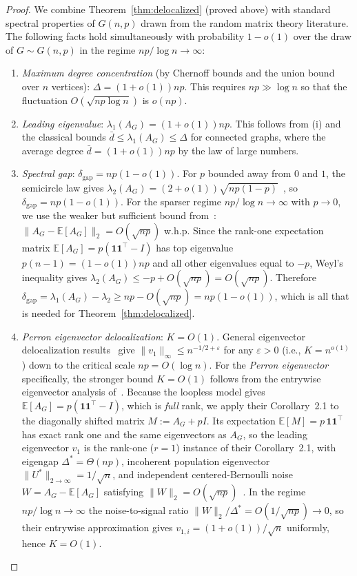 \documentclass[11pt]{article}
\theoremstyle{definition}
\newcommand{\eps}{\varepsilon}
\newcommand{\lamG}{\lambda_1(A_G)}
\newcommand{\vone}{v_1}
\newcommand{\E}{\mathbb{E}}
\begin{document}
\begin{proof}
We combine Theorem~\ref{thm:delocalized} (proved above) with standard spectral
properties of $G(n,p)$ drawn from the random matrix theory literature.
The following facts hold simultaneously with probability $1 - o(1)$ over the draw
of $G \sim G(n,p)$ in the regime $np/\log n \to \infty$:

\begin{enumerate}[label=(\roman*),nosep]
\item \emph{Maximum degree concentration} (by Chernoff bounds and the union bound over
$n$ vertices):
$\Delta = (1+o(1))np$. This requires $np \gg \log n$ so that the fluctuation
$O(\sqrt{np\log n})$ is $o(np)$.

\item \emph{Leading eigenvalue}: $\lamG = (1+o(1))np$.
This follows from (i) and the classical bounds $\bar{d} \leq \lamG \leq \Delta$
for connected graphs, where the average degree $\bar{d} = (1+o(1))np$ by the
law of large numbers.

\item \emph{Spectral gap}: $\delta_{\mathrm{gap}} = np(1 - o(1))$.
For $p$ bounded away from $0$ and $1$, the semicircle law gives
$\lambda_2(A_G) = (2+o(1))\sqrt{np(1-p)}$~\citep{erdos2013spectral},
so $\delta_{\mathrm{gap}} = np(1-o(1))$.
For the sparser regime $np/\log n \to \infty$ with $p \to 0$, we use the weaker
but sufficient bound from~\citet{le2017concentration}:
$\|A_G - \E[A_G]\|_2 = O(\sqrt{np})$ w.h.p. Since the rank-one expectation matrix
$\E[A_G] = p(\mathbf{1}\mathbf{1}^\top - I)$ has top eigenvalue
$p(n-1) = (1-o(1))np$ and all other eigenvalues equal to $-p$,
Weyl's inequality gives $\lambda_2(A_G) \leq -p + O(\sqrt{np}) = O(\sqrt{np})$.
Therefore $\delta_{\mathrm{gap}} = \lamG - \lambda_2 \geq np - O(\sqrt{np})
= np(1 - o(1))$, which is all that is needed for
Theorem~\ref{thm:delocalized}.


\item \emph{Perron eigenvector delocalization}: $K = O(1)$.
General eigenvector delocalization results~\citep{he2019eigenvectors} give
$\|\vone\|_\infty \leq n^{-1/2+\eps}$ for any $\eps > 0$ (i.e., $K = n^{o(1)}$)
down to the critical scale $np = O(\log n)$.
For the \emph{Perron eigenvector} specifically, the stronger bound $K = O(1)$
follows from the entrywise eigenvector analysis of~\citet[Corollary~2.1]{abbe2020entrywise}.
Because the loopless model gives $\E[A_G] = p(\mathbf{1}\mathbf{1}^\top - I)$,
which is \emph{full} rank, we apply their Corollary~2.1 to the diagonally shifted
matrix $M := A_G + pI$. Its expectation $\E[M] = p\,\mathbf{1}\mathbf{1}^\top$ has
exact rank one and the same eigenvectors as $A_G$, so the leading eigenvector $\vone$
is the rank-one ($r=1$) instance of their Corollary~2.1, with eigengap
$\Delta^* = \Theta(np)$, incoherent population eigenvector
$\|U^*\|_{2\to\infty} = 1/\sqrt{n}$, and independent centered-Bernoulli noise
$W = A_G - \E[A_G]$ satisfying $\|W\|_2 = O(\sqrt{np})$~\citep{le2017concentration}.
In the regime $np/\log n \to \infty$ the noise-to-signal ratio
$\|W\|_2/\Delta^* = O(1/\sqrt{np}) \to 0$, so their entrywise approximation gives
$v_{1,i} = (1+o(1))/\sqrt{n}$ uniformly, hence $K = O(1)$.


\end{enumerate}
\end{proof}
\end{document}
